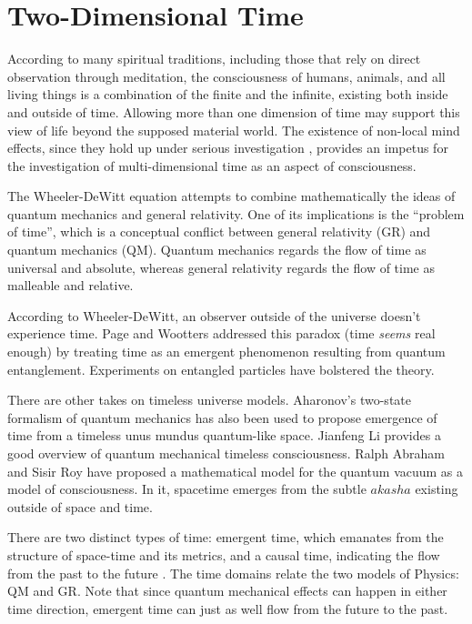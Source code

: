 \section{\label{sec:level1}Two-Dimensional Time}

According to many spiritual traditions, including those that rely on
direct observation through meditation, the consciousness of humans, animals,
and all living things is a combination of the finite and the infinite,
existing both inside and outside of time.
Allowing more than one dimension of time may support this view
of life beyond the supposed material world.
The existence of non-local mind effects, since they hold up under serious
investigation \cite{Kelly}, provides an impetus for the investigation of
multi-dimensional time as an aspect of consciousness.

The Wheeler-DeWitt equation \cite{DeWitt} attempts to combine mathematically
the ideas of quantum mechanics and general relativity.
One of its implications is the ``problem of time'',
which is a conceptual conflict between general relativity (GR)
and quantum mechanics (QM).
Quantum mechanics regards the flow of time as universal and absolute, whereas
general relativity regards the flow of time as malleable and relative.

According to Wheeler-DeWitt, an observer outside of the universe
doesn't experience time. Page and Wootters \cite{Page} addressed this paradox
(time \textit{seems} real enough) by treating time as an emergent phenomenon
resulting from quantum entanglement.
Experiments \cite{Moreva} on entangled particles have bolstered the theory.

There are other takes on timeless universe models.
Aharonov's two-state formalism of quantum mechanics has also been used
\cite{Lobo} to propose emergence of time from a timeless unus mundus
quantum-like space.
Jianfeng Li provides a good overview \cite{Jianfeng} of quantum mechanical
timeless consciousness.
Ralph Abraham and Sisir Roy \cite{AbrahamRoy} have proposed a
mathematical model for the quantum vacuum as a model of consciousness.
In it, spacetime emerges from the subtle $akasha$
existing outside of space and time. 

There are two distinct types of time: emergent time, which emanates from the
structure of space-time and its metrics, and a causal time, indicating the flow
from the past to the future \cite{Brunet}. The time domains relate the
two models of Physics: QM and GR. 
Note that since quantum mechanical effects can happen in either time direction,
emergent time can just as well flow from the future to the past.

